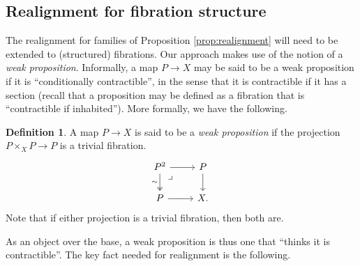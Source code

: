 \documentclass[12pt]{article}
\renewcommand{\to}{\ensuremath{\rightarrow}}
\theoremstyle{remark}
\theoremstyle{definition}
\newtheorem{definition}[theorem]{Definition}
\newcommand{\pbmark}{\ar[dr, phantom, "\lrcorner" very near start, shift right=.5ex]}	%
\begin{document}

\subsection{Realignment for fibration structure}\label{sec:realignment}

The realignment for families of Proposition \ref{prop:realignment} will need to be extended to (structured) fibrations. Our approach makes use of the notion of a \emph{weak proposition}.  Informally, a map $P\to X$ may be said to be a weak proposition if it is ``conditionally contractible'', in the sense that it is contractible if it has a section (recall that a proposition may be defined as a fibration that is ``contractible if inhabited'').  More formally, we have the following.

\begin{definition}
A map $P\to X$ is said to be a \emph{weak proposition} if the projection $P\times_X P\to P$ is a trivial fibration.
\begin{equation}\label{diagram:weakprop}
\begin{tikzcd}
P^2 \ar[d,two heads,swap,"{\sim}"] \ar[r]  \pbmark & P \ar[d] \\
P \ar[r] &  X.
\end{tikzcd}
\end{equation}
Note that if either projection is a trivial fibration, then both are.
\end{definition}

As an object over the base, a weak proposition is thus one that ``thinks it is contractible''.  The key fact needed for realignment is the following.
\end{document}
